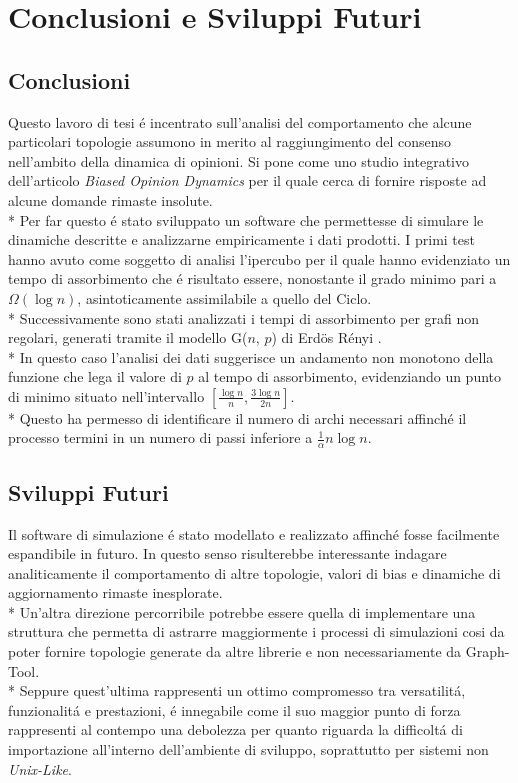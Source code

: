 \documentclass[../Tesi.tex]{subfiles}
\begin{document}
\chapter{Conclusioni e Sviluppi Futuri}
\section{Conclusioni}
Questo lavoro di tesi \'e incentrato sull'analisi del comportamento che alcune particolari topologie assumono in merito al raggiungimento del consenso nell'ambito della dinamica di opinioni. Si pone come uno studio integrativo dell'articolo \emph{Biased Opinion Dynamics} \cite{DBLP:journals/corr/abs-2008-13589} per il quale cerca di fornire risposte ad alcune domande rimaste insolute.\\*
Per far questo \'e stato sviluppato un software che permettesse di simulare le dinamiche descritte e analizzarne empiricamente i dati prodotti. I primi test hanno avuto come soggetto di analisi l'ipercubo per il quale hanno evidenziato un tempo di assorbimento che \'e risultato essere, nonostante il grado minimo pari a $\Omega(\log{n})$, asintoticamente assimilabile a quello del Ciclo.\\*
Successivamente sono stati analizzati i tempi di assorbimento per grafi non regolari, generati tramite il modello G($n$, $p$) di Erd{\"o}s R\'enyi \cite{Erdos:1959:pmd}.\\*
In questo caso l'analisi dei dati suggerisce un andamento non monotono della funzione che lega il valore di $p$ al tempo di assorbimento, evidenziando un punto di minimo situato nell'intervallo $[\frac{\log{n}}{n} , \frac{3\log{n}}{2n}]$.\\*
Questo ha permesso di identificare il numero di archi necessari affinch\'e il processo termini in un numero di passi inferiore a $\frac{1}{\alpha}n\log{}n$.
\section{Sviluppi Futuri}
Il software di simulazione \'e stato modellato e realizzato affinch\'e fosse facilmente espandibile in futuro. In questo senso risulterebbe interessante indagare analiticamente il comportamento di altre topologie, valori di bias e dinamiche di aggiornamento rimaste inesplorate.\\*
Un'altra direzione percorribile potrebbe essere quella di implementare una struttura che permetta di astrarre maggiormente i processi di simulazioni cosi da poter fornire topologie generate da altre librerie e non necessariamente da Graph-Tool.\\*
Seppure quest'ultima rappresenti un ottimo compromesso tra versatilit\'a, funzionalit\'a e prestazioni, \'e innegabile come il suo maggior punto di forza rappresenti al contempo una debolezza per quanto riguarda la difficolt\'a di importazione all'interno dell'ambiente di sviluppo, soprattutto per sistemi non \emph{Unix-Like}.
\end{document}

